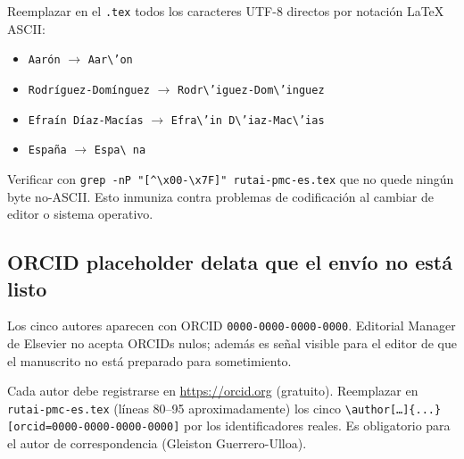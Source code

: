 \documentclass[11pt,a4paper]{article}
\begin{document}
\begin{abordaje}
Reemplazar en el \texttt{.tex} todos los caracteres UTF-8 directos por notaci\'on LaTeX ASCII:

\begin{itemize}
  \item \texttt{Aar\'on} $\to$ \texttt{Aar\textbackslash 'on}
  \item \texttt{Rodr\'iguez-Dom\'inguez} $\to$ \texttt{Rodr\textbackslash 'iguez-Dom\textbackslash 'inguez}
  \item \texttt{Efra\'in D\'iaz-Mac\'ias} $\to$ \texttt{Efra\textbackslash 'in D\textbackslash 'iaz-Mac\textbackslash 'ias}
  \item \texttt{Espa\~na} $\to$ \texttt{Espa\textbackslash \string ~na}
\end{itemize}

Verificar con \texttt{grep -nP "[\^{}\textbackslash x00-\textbackslash x7F]" rutai-pmc-es.tex} que no quede ning\'un byte no-ASCII. Esto inmuniza contra problemas de codificaci\'on al cambiar de editor o sistema operativo.
\end{abordaje}

\subsection{ORCID placeholder delata que el env\'io no est\'a listo}

\begin{deficiencia}[M.3 --- Deficiencia]
Los cinco autores aparecen con ORCID \texttt{0000-0000-0000-0000}. Editorial Manager de Elsevier no acepta ORCIDs nulos; adem\'as es se\~nal visible para el editor de que el manuscrito no est\'a preparado para sometimiento.
\end{deficiencia}

\begin{abordaje}
Cada autor debe registrarse en \url{https://orcid.org} (gratuito). Reemplazar en \texttt{rutai-pmc-es.tex} (l\'ineas 80--95 aproximadamente) los cinco \texttt{\textbackslash author[\ldots]\{...\}[orcid=0000-0000-0000-0000]} por los identificadores reales. Es obligatorio para el autor de correspondencia (Gleiston Guerrero-Ulloa).
\end{abordaje}

\end{document}
